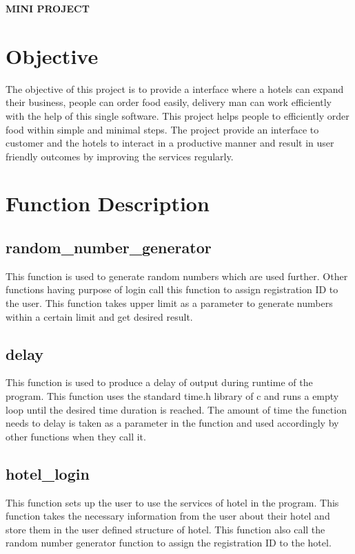 \documentclass[12pt]{article}
\begin{document}
\pagestyle{fancy}
\fancyfoot{}
\fancyfoot[R]{\thepage}

\begin{center}
\LARGE{\textbf{MINI PROJECT}}
\end{center}

\section{Objective}
The objective of this project is to provide a interface where a hotels can expand their business, people can order food easily, delivery man can work efficiently with the help of this single software. This project helps people to efficiently order food within simple and minimal steps. The project provide an interface to customer and the hotels to interact in a productive manner and result in user friendly outcomes by improving the services regularly.

\section{Function Description}
\subsection{random\_number\_generator}
This function is used to generate random numbers which are used further. Other functions having purpose of login call this function to assign registration ID to the user. This function takes upper limit as a parameter to generate numbers within a certain limit and get desired result.
\subsection{delay}
This function is used to produce a delay of output during runtime of the program. This function uses the standard time.h library of c and runs a empty loop until the desired time duration is reached. The amount of time the function needs to delay is taken as a parameter in the function and used accordingly by other functions when they call it. 
\subsection{hotel\_login}
This function sets up the user to use the services of hotel in the program. This function takes the necessary information from the user about their hotel and store them in the user defined structure of hotel. This function also call the random number generator function to assign the registration ID to the hotel.
\end{document}
